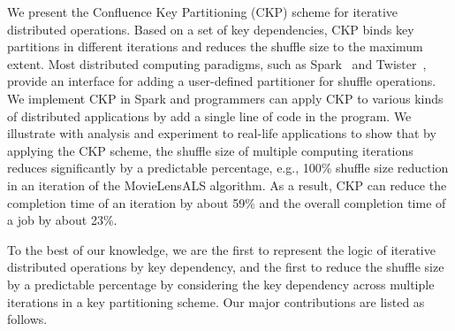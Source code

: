 \documentclass[10pt,journal,compsoc]{IEEEtran}
\begin{document}
We present the Confluence Key Partitioning (CKP) scheme for iterative distributed operations. 
Based on a set of key dependencies, CKP binds key partitions in 
different iterations and reduces the shuffle size to the maximum
extent. 
Most distributed computing paradigms, such as Spark~\cite{zaharia2012resilient} and Twister~\cite{ekanayake2010twister},
provide an interface for adding a user-defined partitioner for shuffle operations.
We implement CKP in Spark and programmers can apply CKP to various 
kinds of distributed applications by add a single line of code
in the program.
We illustrate with analysis and experiment to real-life applications 
to show that by applying the CKP scheme, 
the shuffle size of multiple computing
iterations reduces significantly by a predictable percentage, 
e.g., 100\% shuffle size reduction in an iteration of the MovieLensALS algorithm. 
As a result, CKP can reduce the completion time of an iteration by about 59\%
and the overall completion time of a job by about 23\%. 

To the best of our knowledge, we are the first to 
represent the logic of iterative distributed operations
by key dependency, and the first to reduce the 
shuffle size by a predictable percentage by considering the key dependency 
across multiple iterations in a key partitioning scheme.
Our major contributions are listed as follows.
\end{document}
